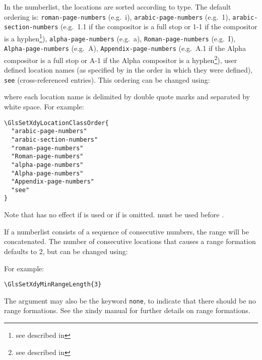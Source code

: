 \documentclass{nlctdoc}
\begin{document}
In the \gls{numberlist}, the locations are sorted according to
type. The default ordering is: \texttt{roman-page-numbers} (e.g.\
i), \texttt{arabic-page-numbers} (e.g.\ 1),
\texttt{arabic-section-numbers} (e.g.\ 1.1 if the compositor is a
full stop or 1-1 if the compositor is a hyphen\footnote{see
 described in }),
\texttt{alpha-page-numbers} (e.g.\ a), \texttt{Roman-page-numbers}
(e.g.\ I), \texttt{Alpha-page-numbers} (e.g.\ A),
\texttt{Appendix-page-numbers} (e.g.\ A.1 if the Alpha compositor is
a full stop or A-1 if the Alpha compositor is a hyphen\footnote{see
\ics{setAlphaCompositor} described in
}), user defined location names (as
specified by  in the order in which they were
defined), \texttt{see} (cross-referenced entries). This ordering can
be changed using:

\DescribeMacro{\GlsSetXdyLocationClassOrder}
\begin{definition}
\end{definition}
where each location name is delimited by double quote marks and
separated by white space. For example:
\begin{verbatim}
\GlsSetXdyLocationClassOrder{
  "arabic-page-numbers"
  "arabic-section-numbers"
  "roman-page-numbers"
  "Roman-page-numbers"
  "alpha-page-numbers"
  "Alpha-page-numbers"
  "Appendix-page-numbers"
  "see"
}
\end{verbatim}

\begin{important}\raggedright
Note that  has no effect if 
 is used or if  is omitted.
\cs{GlsSetXdyLocationClassOrder} must be used before 
\ics{makeglossaries}.
\end{important}

If a \gls{numberlist} consists of a sequence of consecutive 
numbers, the range will be concatenated. The 
number of consecutive locations that causes a range formation 
defaults to 2, but can be changed using:
\begin{definition}[\DescribeMacro{\GlsSetXdyMinRangeLength}]
\end{definition}
For example:
\begin{verbatim}
\GlsSetXdyMinRangeLength{3}
\end{verbatim}
The argument may also be the keyword \texttt{none}, to indicate that
there should be no range formations. See the \gls{xindy}
manual for further details on range formations.
\end{document}
